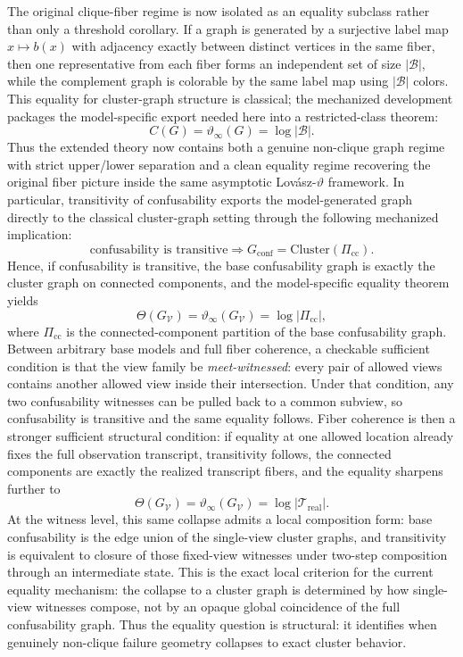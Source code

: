 The original clique-fiber regime is now isolated as an equality subclass rather than only a threshold corollary. If a graph is generated by a surjective label map $x \mapsto b(x)$ with adjacency exactly between distinct vertices in the same fiber, then one representative from each fiber forms an independent set of size $|\mathcal B|$, while the complement graph is colorable by the same label map using $|\mathcal B|$ colors. This equality for cluster-graph structure is classical; the mechanized development packages the model-specific export needed here into a restricted-class theorem:
\[
C(G)=\vartheta_{\infty}(G)=\log |\mathcal B|.
\]
Thus the extended theory now contains both a genuine non-clique graph regime with strict upper/lower separation and a clean equality regime recovering the original fiber picture inside the same asymptotic Lov\'asz-$\vartheta$ framework. In particular, transitivity of confusability exports the model-generated graph directly to the classical cluster-graph setting through the following mechanized implication:
\[
\text{confusability is transitive}
\Longrightarrow
G_{\mathrm{conf}}=\mathrm{Cluster}(\Pi_{\mathrm{cc}}).
\]
Hence, if confusability is transitive, the base confusability graph is exactly the cluster graph on connected components, and the model-specific equality theorem yields
\[
\Theta(G_{\mathcal V})=\vartheta_\infty(G_{\mathcal V})=\log |\Pi_{\mathrm{cc}}|,
\]
where $\Pi_{\mathrm{cc}}$ is the connected-component partition of the base confusability graph. Between arbitrary base models and full fiber coherence, a checkable sufficient condition is that the view family be \emph{meet-witnessed}: every pair of allowed views contains another allowed view inside their intersection. Under that condition, any two confusability witnesses can be pulled back to a common subview, so confusability is transitive and the same equality follows. Fiber coherence is then a stronger sufficient structural condition: if equality at one allowed location already fixes the full observation transcript, transitivity follows, the connected components are exactly the realized transcript fibers, and the equality sharpens further to
\[
\Theta(G_{\mathcal V})=\vartheta_\infty(G_{\mathcal V})=\log |\mathcal T_{\mathrm{real}}|.
\]
At the witness level, this same collapse admits a local composition form: base confusability is the edge union of the single-view cluster graphs, and transitivity is equivalent to closure of those fixed-view witnesses under two-step composition through an intermediate state. This is the exact local criterion for the current equality mechanism: the collapse to a cluster graph is determined by how single-view witnesses compose, not by an opaque global coincidence of the full confusability graph. Thus the equality question is structural: it identifies when genuinely non-clique failure geometry collapses to exact cluster behavior.


